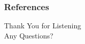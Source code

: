 \documentclass{beamer}
\begin{document}
\begin{frame}[allowframebreaks]
        \frametitle{References}
        
\end{frame}
\begin{frame}{}
\begin{center}
    \Large Thank You for Listening\\[6mm]
    \Large Any Questions? 
\end{center}
\end{frame}
\end{document}
